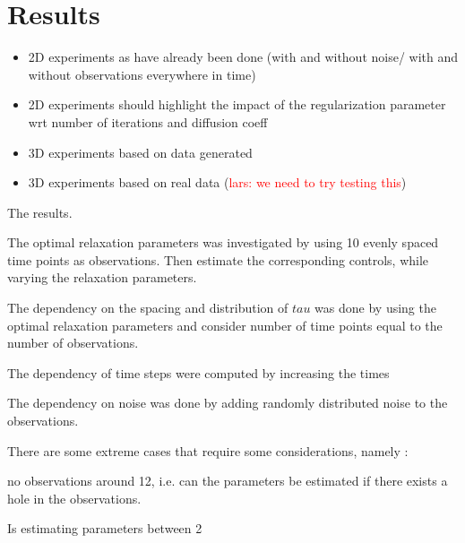\documentclass[11pt,a4paper]{article}
\renewcommand{\comment}[1]{\textcolor{red}{#1}}
\begin{document}
\section{Results}
\begin{itemize}
\item 2D experiments as have already been done (with and without noise/ with and without observations everywhere in time) 
\item 2D experiments should highlight the impact of the regularization parameter wrt number of iterations and diffusion 
coeff 
\item 3D experiments based on data generated  
\item 3D experiments based on real data (\comment{lars: we need to try testing this}) 
\end{itemize}



The results.

The optimal relaxation parameters was investigated by using 10 evenly spaced time points as observations. Then estimate the corresponding controls, while varying the relaxation parameters.


The dependency on the spacing and distribution of $tau$ was done by using the optimal relaxation parameters and consider number of time points equal to the number of observations. 


The dependency of time steps were computed by increasing the times



The dependency on noise was done by adding randomly distributed noise to the observations.

There are some extreme cases that require some considerations, namely :

no observations around 12, i.e. can the parameters be estimated if there exists a hole in the observations.

Is estimating parameters between 2
\end{document}
